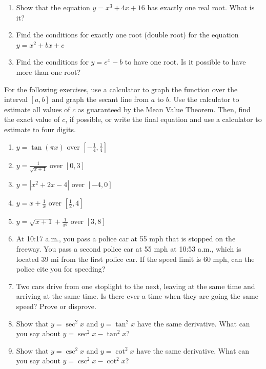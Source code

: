 \documentclass{exercises}
\begin{document}
\begin{enumerate}[resume]
\item Show that the equation $y=x^{3}+4x+16$ has exactly one real root. What is it?
\item Find the conditions for exactly one root (double root) for the equation $y=x^{2}+bx+c$
\item Find the conditions for $y=e^{x}-b$ to have one root. Is it possible to have more than one root?
\end{enumerate}

For the following exercises, use a calculator to graph the function over the interval $[a,b]$ and graph the secant line from $a$ to $b$. Use the calculator to estimate all values of $c$ as guaranteed by the Mean Value Theorem. Then, find the exact value of $c$, if possible, or write the final equation and use a calculator to estimate to four digits.

\begin{enumerate}[resume]
\item \techrequired $y=\tan(\pi x)$ over $[-\frac{1}{4},\frac{1}{4}]$
\item \techrequired $y=\frac{1}{\sqrt{x+1}}$ over $[0,3]$
\item \techrequired $y=|x^{2}+2x-4|$ over $[-4,0]$
\item \techrequired $y=x+\frac{1}{x}$ over $[\frac{1}{2},4]$
\item \techrequired $y=\sqrt{x+1}+\frac{1}{x^{2}}$ over $[3,8]$
\item At 10:17 a.m., you pass a police car at 55 mph that is stopped on the freeway. You pass a second police car at 55 mph at 10:53 a.m., which is located 39 mi from the first police car. If the speed limit is 60 mph, can the police cite you for speeding?
\item Two cars drive from one stoplight to the next, leaving at the same time and arriving at the same time. Is there ever a time when they are going the same speed? Prove or disprove.
\item Show that $y=\sec^{2}x$ and $y=\tan^{2}x$ have the same derivative. What can you say about $y=\sec^{2}x-\tan^{2}x$?
\item Show that $y=\csc^{2}x$ and $y=\cot^{2}x$ have the same derivative. What can you say about $y=\csc^{2}x-\cot^{2}x$?
\end{enumerate}
\end{document}
